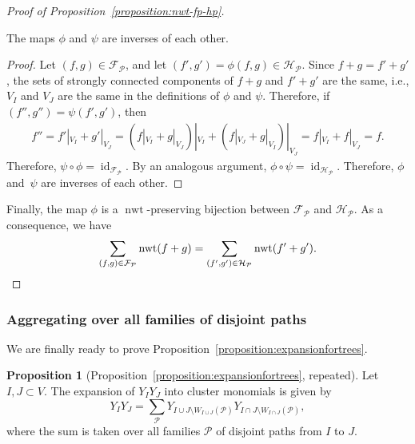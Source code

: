 \documentclass[11pt]{article}
\theoremstyle{definition}
\newtheorem*{prop*}{Proposition}
\numberwithin{equation}{section}
\newcommand{\vertices}{V}
\DeclareMathOperator{\normalizedweight}{nwt}
\begin{document}
\begin{proof}[Proof of Proposition~\ref{proposition:nwt-fp-hp}]
\begin{claim}
    The maps \(\phi\) and \(\psi\) are inverses of each other.
\end{claim}
\begin{proof}
    Let \((f, g) \in \mathcal{F}_{\mathcal{P}}\), and let \((f', g') = \phi(f, g) \in \mathcal{H}_{\mathcal{P}}\).
    Since \(f+g = f'+g'\), the sets of strongly connected components of \(f+g\) and \(f'+g'\) are the same, i.e., \(V_I\) and \(V_J\) are the same in the definitions of \(\phi\) and \(\psi\).
    Therefore, if \((f'', g'') = \psi(f', g')\),
    then
    \begin{align*}
        f'' = f'|_{V_I} + g'|_{V_J} = (f|_{V_I} + g|_{V_J})|_{V_I} + (f|_{V_J} + g|_{V_I})|_{V_J} = f|_{V_I} + f|_{V_J} = f.
    \end{align*}
    Therefore, \(\psi \circ \phi = \operatorname{id}_{\mathcal{F}_{\mathcal{P}}}\).
    By an analogous argument, \(\phi \circ \psi = \operatorname{id}_{\mathcal{H}_{\mathcal{P}}}\).
    Therefore, \(\phi\) and~\(\psi\) are inverses of each other.
\end{proof}

Finally, the map \(\phi\) is a \(\normalizedweight\)-preserving bijection between \(\mathcal{F}_{\mathcal{P}}\) and \(\mathcal{H}_{\mathcal{P}}\).
As a consequence, we have
\begin{equation*} \label{eq:sum-Fp-equals-sum-Hp}
    \sum_{(f,g) \in \mathcal{F}_{\mathcal{P}}} \normalizedweight(f+g) = \sum_{(f',g') \in \mathcal{H}_{\mathcal{P}}} \normalizedweight(f'+g'). \qedhere
\end{equation*}
\end{proof}

\subsubsection{Aggregating over all families of disjoint paths}

We are finally ready to prove Proposition~\ref{proposition:expansionfortrees}.

\begin{prop*}[Proposition~\ref{proposition:expansionfortrees}, repeated]
    Let \(I, J \subset \vertices\).
    The expansion of \(Y_IY_J\) into cluster monomials is given by
    \begin{equation*}
        Y_IY_J = \sum_{\mathcal{P}} Y_{I \cup J \setminus W_{I \cup J}(\mathcal{P})}Y_{I \cap J \setminus W_{I \cap J}(\mathcal{P})},
    \end{equation*} 
    where the sum is taken over all families \(\mathcal{P}\) of disjoint paths from \(I\) to \(J\).
\end{prop*}
\end{document}
